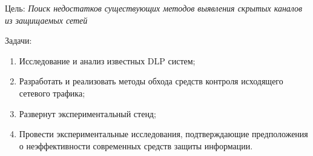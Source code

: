 Цель: \textit{Поиск недостатков существующих методов выявления скрытых каналов из защищаемых сетей}
	
Задачи:

\begin{enumerate}
	\item
		Исследование и анализ известных DLP систем;
	\item
		Разработать и реализовать методы обхода средств контроля исходящего сетевого трафика;
	\item
		Развернут экспериментальный стенд;
	\item
		Провести экспериментальные исследования, подтверждающие предположения о неэффективности современных средств защиты информации.
\end{enumerate}

	